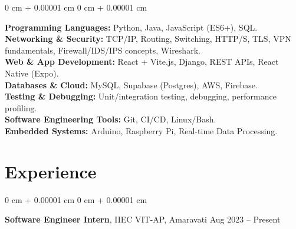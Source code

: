 \documentclass[10pt, letterpaper]{article}
\newenvironment{onecolentry}{ \begin{adjustwidth}{ 0 cm + 0.00001 cm }{ 0 cm + 0.00001 cm }
}{ \end{adjustwidth} } %
\newenvironment{twocolentry}[2][]{ \onecolentry \def\secondColumn{#2} \setcolumnwidth{\fill, 4.5 cm}
\begin{paracol}{2} }{ \switchcolumn \raggedleft \secondColumn \end{paracol}
\endonecolentry } %
\begin{document}
\begin{onecolentry}
		\textbf{Programming Languages:} Python, Java, JavaScript (ES6+), SQL.\\
	\vspace{0.10 cm}
		\textbf{Networking \& Security:} TCP/IP, Routing, Switching, HTTP/S, TLS, VPN fundamentals, Firewall/IDS/IPS concepts, Wireshark. \\
	\vspace{0.10 cm}
		\textbf{Web \& App Development:} React + Vite.js, Django, REST APIs, React Native (Expo). \\
	\vspace{0.10 cm}
		\textbf{Databases \& Cloud:} MySQL, Supabase (Postgres), AWS, Firebase. \\
	\vspace{0.10 cm}
		\textbf{Testing \& Debugging:} Unit/integration testing, debugging, performance profiling.\\
	\vspace{0.10 cm}
		\textbf{Software Engineering Tools:} Git, CI/CD, Linux/Bash.\\
	\vspace{0.10 cm}
		\textbf{Embedded Systems:} Arduino, Raspberry Pi, Real-time Data Processing.  \\
\end{onecolentry}



	\section{Experience}

\begin{twocolentry}
	{ Aug 2023 – Present } \textbf{Software Engineer Intern}, IIEC VIT-AP, Amaravati
\end{twocolentry}
\end{document}
